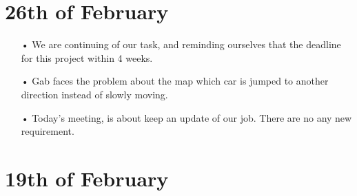 \documentclass[11pt]{article}
\begin{document}
\section{26th of February}
\begin{itemize}
\item[•] We are continuing of our task, and reminding ourselves that the deadline for this project within 4 weeks. 
\item[•] Gab faces the problem about the map which car is jumped to another direction instead of slowly moving. 
\item[•] Today's meeting, is about keep an update of our job. There are no any new requirement. 
\end{itemize}

\section{19th of February}
\end{document}
